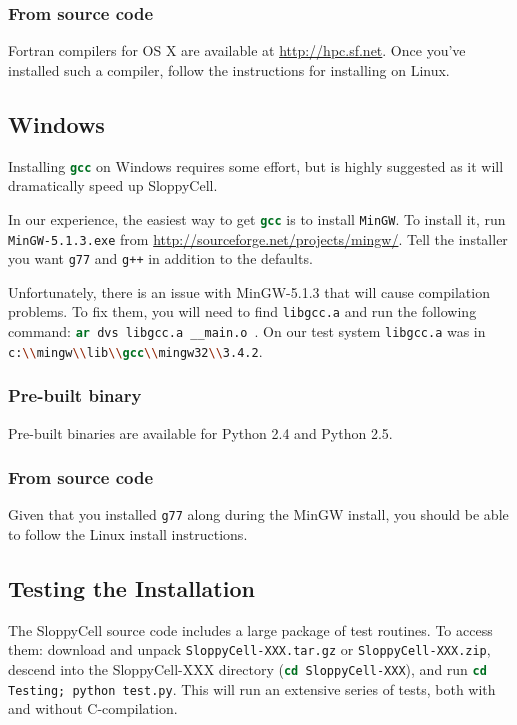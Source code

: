 \documentclass[12pt]{article}
\newcommand{\shell}[1]{\lstinline[language=csh, showstringspaces=False]!#1!}
\begin{document}
\subsubsection{From source code}
Fortran compilers for OS X are available at  \url{http://hpc.sf.net}. Once you've installed 
such a compiler, follow the instructions for installing on Linux.

\subsection{Windows}
Installing \shell{gcc} on Windows requires some effort, but is highly suggested as it will dramatically speed up SloppyCell.

In our experience, the easiest way to get \shell{gcc} is to install \shell{MinGW}.
To install it, run \shell{MinGW-5.1.3.exe} from
\url{http://sourceforge.net/projects/mingw/}.
Tell the installer you want \shell{g77} and \shell{g++} in addition to the defaults.

Unfortunately, there is an issue with MinGW-5.1.3 that will cause compilation problems. To fix them, you will need to find \shell{libgcc.a} and run the following command:
\shell{ar dvs libgcc.a __main.o}~\cite{bib:SCuser:ar}.
On our test system \shell{libgcc.a} was in \shell{c:\\mingw\\lib\\gcc\\mingw32\\3.4.2}.

\subsubsection{Pre-built binary}
Pre-built binaries are available for Python 2.4 and Python 2.5.

\subsubsection{From source code}
Given that you installed \shell{g77} along during the MinGW install, you should be able to follow the Linux install instructions.

\subsection{Testing the Installation}
The SloppyCell source code includes a large package of test routines.
To access them: download and unpack \shell{SloppyCell-XXX.tar.gz} or \shell{SloppyCell-XXX.zip}, descend into the SloppyCell-XXX directory (\shell{cd SloppyCell-XXX}), and run \shell{cd Testing; python test.py}.
This will run an extensive series of tests, both with and without C-compilation.
\end{document}
